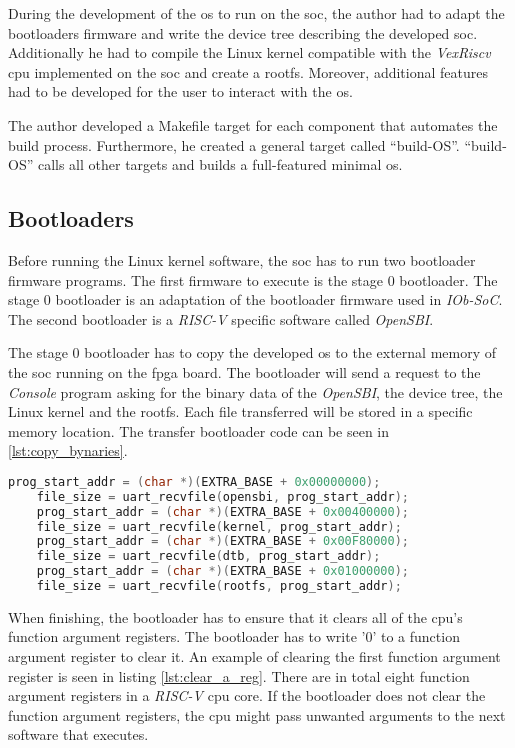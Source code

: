 During the development of the \acrshort{os} to run on the \acrshort{soc}, the author had to adapt the bootloaders firmware and write the device tree describing the developed \acrshort{soc}. Additionally he had to compile the Linux kernel compatible with the \textit{VexRiscv} \acrshort{cpu} implemented on the \acrshort{soc} and create a \acrlong{rootfs}. Moreover, additional features had to be developed for the user to interact with the \acrshort{os}.

The author developed a Makefile target for each component that automates the build process. Furthermore, he created a general target called \enquote{build-OS}. \enquote{build-OS} calls all other targets and builds a full-featured minimal \acrshort{os}.

\subsection{Bootloaders}
Before running the Linux kernel software, the \acrshort{soc} has to run two bootloader firmware programs. The first firmware to execute is the stage 0 bootloader. The stage 0 bootloader is an adaptation of the bootloader firmware used in \textit{IOb-SoC}. The second bootloader is a \textit{RISC-V} specific software called \textit{OpenSBI}.

The stage 0 bootloader has to copy the developed \acrshort{os} to the external memory of the \acrshort{soc} running on the \acrshort{fpga} board. The bootloader will send a request to the \textit{Console} program asking for the binary data of the \textit{OpenSBI}, the device tree, the Linux kernel and the \acrlong{rootfs}. Each file transferred will be stored in a specific memory location. The transfer bootloader code can be seen in \ref{lst:copy_bynaries}.

\begin{lstlisting}[language=c, caption={Transfer \acrshort{os} to the \acrshort{soc} external memmory.}, label=lst:copy_bynaries]
    prog_start_addr = (char *)(EXTRA_BASE + 0x00000000);
    file_size = uart_recvfile(opensbi, prog_start_addr);
    prog_start_addr = (char *)(EXTRA_BASE + 0x00400000);
    file_size = uart_recvfile(kernel, prog_start_addr);
    prog_start_addr = (char *)(EXTRA_BASE + 0x00F80000);
    file_size = uart_recvfile(dtb, prog_start_addr);
    prog_start_addr = (char *)(EXTRA_BASE + 0x01000000);
    file_size = uart_recvfile(rootfs, prog_start_addr);
\end{lstlisting}

When finishing, the bootloader has to ensure that it clears all of the \acrshort{cpu}’s function argument registers. The bootloader has to write '0' to a function argument register to clear it. An example of clearing the first function argument register is seen in listing \ref{lst:clear_a_reg}. There are in total eight function argument registers in a \textit{RISC-V} \acrshort{cpu} core. If the bootloader does not clear the function argument registers, the \acrshort{cpu} might pass unwanted arguments to the next software that executes.

